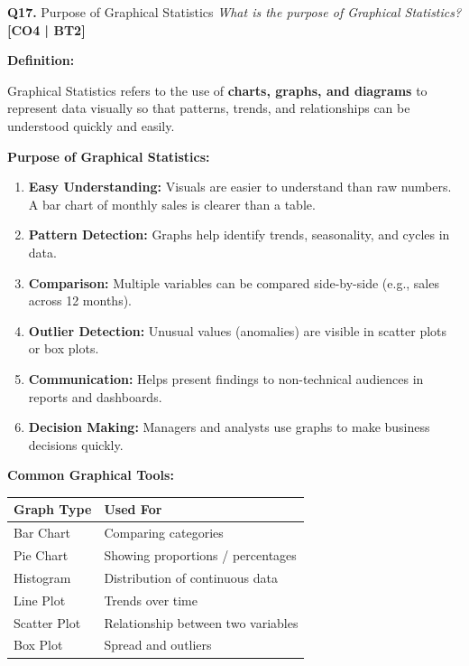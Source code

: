 \documentclass[12pt,a4paper]{article}
\newcommand{\Qno}[1]{\textbf{\color{darkred}Q#1.}}
\newcommand{\term}[1]{\textbf{\color{headingcolor}#1}}
\begin{document}
\vspace{8pt}

\begin{questionbox}{\Qno{17} Purpose of Graphical Statistics}
\textit{What is the purpose of Graphical Statistics?} \hfill \textbf{[CO4 | BT2]}
\end{questionbox}

\begin{answerenv}

\textbf{\color{headingcolor}Definition:}

Graphical Statistics refers to the use of \textbf{charts, graphs, and diagrams} to represent data visually so that patterns, trends, and relationships can be understood quickly and easily.

\vspace{6pt}
\textbf{\color{headingcolor}Purpose of Graphical Statistics:}
\begin{enumerate}[leftmargin=1.8em, itemsep=4pt]
  \item \term{Easy Understanding:} Visuals are easier to understand than raw numbers. A bar chart of monthly sales is clearer than a table.
  \item \term{Pattern Detection:} Graphs help identify trends, seasonality, and cycles in data.
  \item \term{Comparison:} Multiple variables can be compared side-by-side (e.g., sales across 12 months).
  \item \term{Outlier Detection:} Unusual values (anomalies) are visible in scatter plots or box plots.
  \item \term{Communication:} Helps present findings to non-technical audiences in reports and dashboards.
  \item \term{Decision Making:} Managers and analysts use graphs to make business decisions quickly.
\end{enumerate}

\textbf{\color{headingcolor}Common Graphical Tools:}

\begin{center}
\begin{tabular}{ll}
\toprule
\textbf{Graph Type} & \textbf{Used For} \\
\midrule
Bar Chart & Comparing categories \\
Pie Chart & Showing proportions / percentages \\
Histogram & Distribution of continuous data \\
Line Plot & Trends over time \\
Scatter Plot & Relationship between two variables \\
Box Plot & Spread and outliers \\
\bottomrule
\end{tabular}
\end{center}

\end{answerenv}
\end{document}
